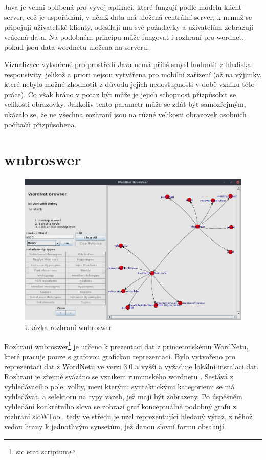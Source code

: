 \documentclass[a4paper, 11pt, oneside]{book}
\begin{document}
			Java je velmi oblíbená pro vývoj aplikací, které fungují podle modelu klient--server, což je uspořádání, v němž data má uložená centrální server, k nemuž se připojují uživatelské klienty, odesílají mu své požadavky a uživatelům zobrazují vrácená data. Na podobném principu může fungovat i rozhraní pro wordnet, pokud jsou data wordnetu uložena na serveru.

			Vizualizace vytvořené pro prostředí Java nemá příliš smysl hodnotit z hlediska responsivity, jelikož a priori nejsou vytvářena pro mobilní zařízení (až na výjimky, které nebylo možné zhodnotit z důvodu jejich nedostupnosti v době vzniku této práce). Co však bráno v potaz být může je jejich schopnost přizpůsobit se velikosti obrazovky. Jakkoliv tento parametr může se zdát být samozřejmým, ukázalo se, že ne všechna rozhraní jsou na různé velikosti obrazovek osobních počítačů přizpůsobena.

			\section{wnbroswer}

				\begin{figure}[ht]
					\centering
					\includegraphics[width=1.0\textwidth]{wnwordnetbrowswer.png}
					\caption{Ukázka rozhraní wnbroswer}
					\label{fig:wnwordnetbrowswer}
				\end{figure}

				Rozhraní wnbroswer\footnote{sic erat scriptum} je určeno k prezentaci dat z princetonskému WordNetu, které pracuje pouze s grafovou grafickou reprezentací. Bylo vytvořeno pro reprezentaci dat z WordNetu ve verzi 3.0 a vyšší a vyžaduje lokální instalaci dat. Rozhraní je zřejmě svázáno se vznikem rumunského wordnetu \parencite{fivser2011visualizing}. Sestává z vyhledávacího pole, volby, mezi kterými syntaktickými kategoriemi se má vyhledávat, a selektoru na typy vazeb, jež mají být zobrazeny. Po úspěšném vyhledání konkrétního slova se zobrazí graf konceptuálně podobný grafu z rozhraní sloWTool, tedy ve středu je uzel reprezentující hledaný výraz, z něhož vedou hrany k jednotlivým synsetům, jež danou slovní formu obsahují. 
\end{document}
